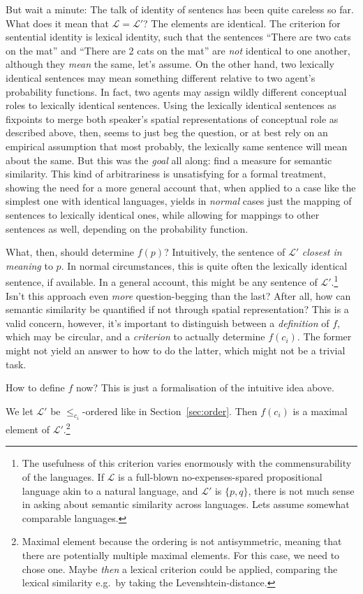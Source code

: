 \documentclass[11pt, a4paper]{scrartcl}
\renewcommand{\i}[1]{\emph{#1}}
\renewcommand{\L}{\mathcal{L}}
\begin{document}
But wait a minute: The talk of identity of sentencs has been quite careless so far. What does it mean that $\L = \L'$? The elements are identical. The criterion for sentential identity is lexical identity, such that the sentences ``There are two cats on the mat'' and ``There are 2 cats on the mat'' are \i{not} identical to one another, although they \i{mean} the same, let's assume. On the other hand, two lexically identical sentences may mean something different relative to two agent's probability functions. In fact, two agents may assign wildly different conceptual roles to lexically identical sentences. Using the lexically identical sentences as fixpoints to merge both speaker's spatial representations of conceptual role as described above, then, seems to just beg the question, or at best rely on an empirical assumption that most probably, the lexically same sentence will mean about the same. But this was the \i{goal} all along: find a measure for semantic similarity. This kind of arbitrariness is unsatisfying for a formal treatment, showing the need for a more general account that, when applied to a case like the simplest one with identical languages, yields in \i{normal} cases just the mapping of sentences to lexically identical ones, while allowing for mappings to other sentences as well, depending on the probability function.

What, then, should determine $f(p)$? Intuitively, the sentence of $\L'$ \i{closest in meaning} to $p$. In normal circumstances, this is quite often the lexically identical sentence, if available. In a general account, this might be any sentence of $\L'$.\footnote{The usefulness of this criterion varies enormously with the commensurability of the languages. If $\L$ is a full-blown no-expenses-spared propositional language akin to a natural language, and $\L'$ is $\{p, q\}$, there is not much sense in asking about semantic similarity across languages. Lets assume somewhat comparable languages.} Isn't this approach even \i{more} question-begging than the last? After all, how can semantic similarity be quantified if not through spatial representation? This is a valid concern, however, it's important to distinguish between a \i{definition} of $f$, which may be circular, and a \i{criterion} to actually determine $f(c_i)$. The former might not yield an answer to how to do the latter, which might not be a trivial task.

How to define $f$ now? This is just a formalisation of the intuitive idea above. 

We let $\L'$ be $\leqslant_{c_i}$-ordered like in Section~\ref{sec:order}. Then $f(c_i)$ is a maximal element of $\L'$.\footnote{Maximal element because the ordering is not antisymmetric, meaning that there are potentially multiple maximal elements. For this case, we need to chose one. Maybe \i{then} a lexical criterion could be applied, comparing the lexical similarity e.g.\ by taking the Levenshtein-distance.} 
\end{document}
